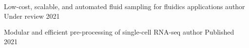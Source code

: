 

\begin{cvhonors}


  \cvhonor
    {Low-cost, scalable, and automated fluid sampling for fluidics applications} %
    {author} %
    {Under review} %
    {2021} %

  \cvhonor
    {Modular and efficient pre-processing of single-cell RNA-seq} %
    {author} %
    {Published} %
    {2021} %
\end{cvhonors}
